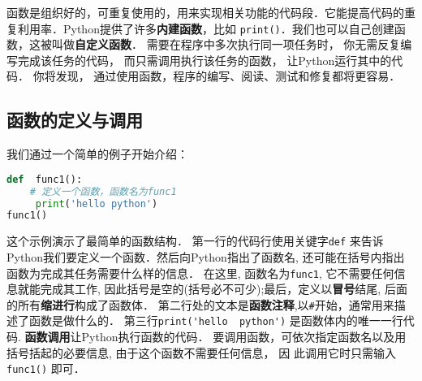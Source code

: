 函数是组织好的，可重复使用的，用来实现相关功能的代码段．它能提高代码的重复利用率．Python提供了许多\textbf{内建函数}，比如 \verb|print()|．我们也可以自己创建函数，这被叫做\textbf{自定义函数}． 需要在程序中多次执行同一项任务时， 你无需反复编写完成该任务的代码， 而只需调用执行该任务的函数， 让Python运行其中的代码． 你将发现， 通过使用函数，程序的编写、阅读、测试和修复都将更容易．

\subsection{函数的定义与调用}
我们通过一个简单的例子开始介绍：
\begin{lstlisting}[language=python]
def  func1():
    # 定义一个函数，函数名为func1
     print('hello python')
func1()
\end{lstlisting}
这个示例演示了最简单的函数结构． 第一行的代码行使用关键字\verb|def| 来告诉Python我们要定义一个函数．然后向Python指出了函数名, 还可能在括号内指出函数为完成其任务需要什么样的信息． 在这里, 函数名为\verb|func1|, 它不需要任何信息就能完成其工作, 因此括号是空的(括号必不可少);最后，定义以\textbf{冒号}结尾, 后面的所有\textbf{缩进行}构成了函数体． 第二行处的文本是\textbf{函数注释},以\verb|#|开始，通常用来描述了函数是做什么的．
第三行\verb|print('hello  python')| 是函数体内的唯一一行代码.
\textbf{函数调用}让Python执行函数的代码． 要调用函数，可依次指定函数名以及用括号括起的必要信息, 由于这个函数不需要任何信息， 因
此调用它时只需输入\verb|func1()| 即可．